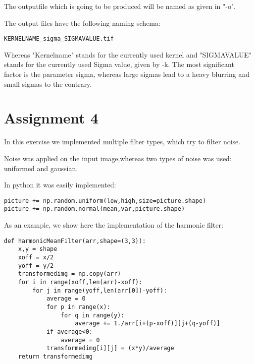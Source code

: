 The outputfile which is going to be produced will be named as given in "-o".

The output files have the following naming schema:

\begin{verbatim}
KERNELNAME_sigma_SIGMAVALUE.tif
\end{verbatim}

Whereas "Kernelname" stands for the currently used kernel and "SIGMAVALUE" stands for the currently used Sigma value, given by -k.
The most significant factor is the parameter sigma, whereas large sigmas lead to a heavy blurring and small sigmas to the contrary.


\section{Assignment 4}

In this exercise we implemented multiple filter types, which try to filter noise.

Noise was applied on the input image,whereas two types of noise was used: uniformed and gaussian.

In python it was easily implemented:
\begin{verbatim}
picture += np.random.uniform(low,high,size=picture.shape)
picture += np.random.normal(mean,var,picture.shape)
\end{verbatim}

As an example, we show here the implementation of the harmonic filter:

\begin{verbatim}
def harmonicMeanFilter(arr,shape=(3,3)):
    x,y = shape
    xoff = x/2
    yoff = y/2
    transformedimg = np.copy(arr)
    for i in range(xoff,len(arr)-xoff):
        for j in range(yoff,len(arr[0])-yoff):
            average = 0
            for p in range(x):
                for q in range(y):
                    average += 1./arr[i+(p-xoff)][j+(q-yoff)]
            if average<0:
                average = 0
            transformedimg[i][j] = (x*y)/average
    return transformedimg
\end{verbatim}

